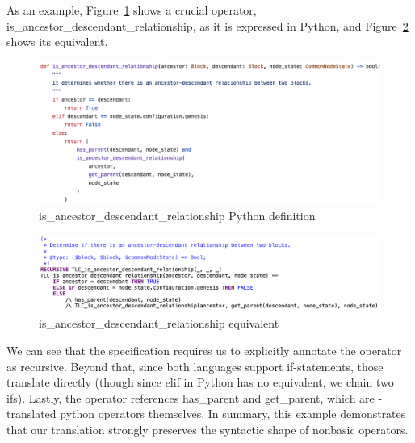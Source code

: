 As an example, Figure~\ref{py_adr} shows a crucial operator, \textsf{is\_ancestor\_descendant\_relationship}, as it is expressed in Python, and Figure~\ref{tla_adr} shows its \tlap{} equivalent.
\begin{figure}
\includegraphics[width=\textwidth]{images/is_ancestor_descendant_relationship.png}
\caption{\textsf{is\_ancestor\_descendant\_relationship} Python definition \label{py_adr}}
\end{figure}

\begin{figure}
\includegraphics[width=\textwidth]{images/TLC_is_ancestor_descendant_relationship.png}
\caption{\textsf{is\_ancestor\_descendant\_relationship} \tlap{} equivalent \label{tla_adr}}
\end{figure}
%
We can see that the \tlap{} specification requires us to explicitly annotate the operator as recursive. 
Beyond that, since both languages support if-statements, those translate directly (though since \textsf{elif} in Python has no equivalent, we chain two ifs). 
Lastly, the \tlap{} operator references \textsf{has\_parent} and \textsf{get\_parent}, which are \tlap{}-translated python operators themselves. 
In summary, this example demonstrates that our translation strongly preserves the syntactic shape of nonbasic operators.
